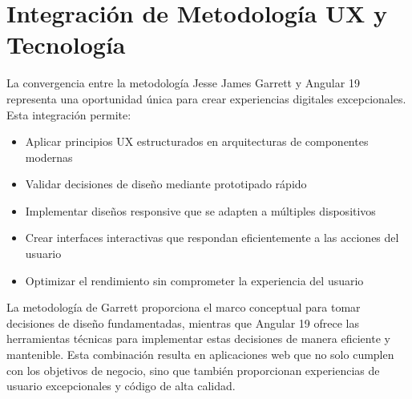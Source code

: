 \section{Integración de Metodología UX y Tecnología}

La convergencia entre la metodología Jesse James Garrett y Angular 19 representa una oportunidad única para crear experiencias digitales excepcionales. Esta integración permite:

\begin{itemize}
    \item Aplicar principios UX estructurados en arquitecturas de componentes modernas
    \item Validar decisiones de diseño mediante prototipado rápido
    \item Implementar diseños responsive que se adapten a múltiples dispositivos
    \item Crear interfaces interactivas que respondan eficientemente a las acciones del usuario
    \item Optimizar el rendimiento sin comprometer la experiencia del usuario
\end{itemize}

La metodología de Garrett proporciona el marco conceptual para tomar decisiones de diseño fundamentadas, mientras que Angular 19 ofrece las herramientas técnicas para implementar estas decisiones de manera eficiente y mantenible. Esta combinación resulta en aplicaciones web que no solo cumplen con los objetivos de negocio, sino que también proporcionan experiencias de usuario excepcionales y código de alta calidad.
